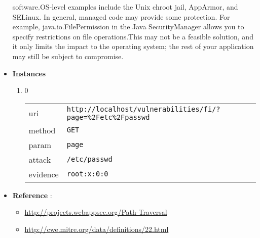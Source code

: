 \documentclass[10pt]{article}
\begin{document}
\begin{itemize}
software.OS-level examples include the Unix chroot jail, AppArmor, and SELinux. In general, managed code may provide some protection. For example, java.io.FilePermission in the Java SecurityManager allows you to specify restrictions on file operations.This may not be a feasible solution, and it only limits the impact to the operating system; the rest of your application may still be subject to compromise.
\item[] \textbf{Instances}
\begin{enumerate}
\item[] 0
\begin{tabular}{| l | p{12cm}}
uri & \texttt{http://localhost/vulnerabilities/fi/?page=\%2Fetc\%2Fpasswd} \\
method & \texttt{GET} \\
param & \texttt{page} \\
attack & \texttt{/etc/passwd} \\
evidence & \texttt{root:x:0:0} \\
\end{tabular}
\end{enumerate}
\item[] \textbf{Reference} : 
\begin{itemize}
\item \url{http://projects.webappsec.org/Path-Traversal}
\item \url{http://cwe.mitre.org/data/definitions/22.html}
\end{itemize}
\end{itemize}
\end{document}
